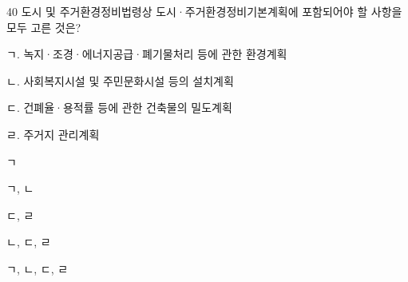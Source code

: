 \begin{question}{40}
도시 및 주거환경정비법령상 도시·주거환경정비기본계획에 포함되어야 할 사항을 모두 고른 것은?
\begin{framedtext}
ㄱ. 녹지·조경·에너지공급·폐기물처리 등에 관한 환경계획 \par
ㄴ. 사회복지시설 및 주민문화시설 등의 설치계획 \par
ㄷ. 건폐율·용적률 등에 관한 건축물의 밀도계획 \par
ㄹ. 주거지 관리계획 \par
\end{framedtext}
\begin{choices}
  \item ㄱ
  \item ㄱ, ㄴ
  \item ㄷ, ㄹ
  \item ㄴ, ㄷ, ㄹ
  \item ㄱ, ㄴ, ㄷ, ㄹ
\end{choices}
\end{question}
